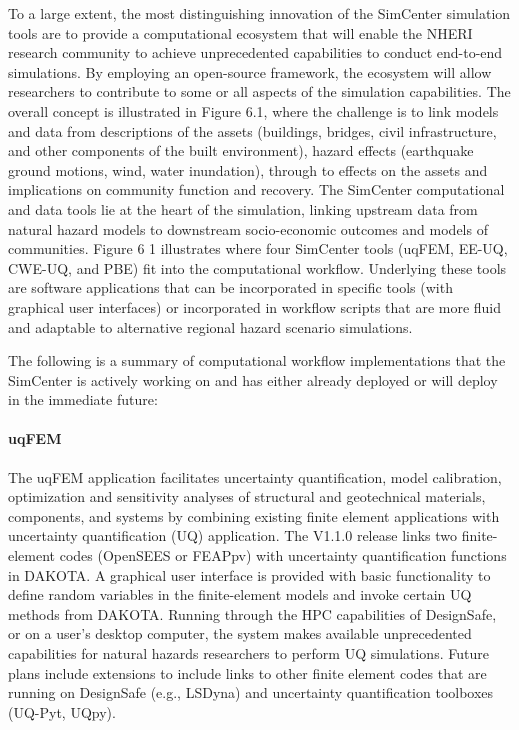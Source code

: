 To a large extent, the most distinguishing innovation of the SimCenter simulation tools are to provide a computational ecosystem that will enable the NHERI research community to achieve unprecedented capabilities to conduct end-to-end simulations. By employing an open-source framework, the ecosystem will allow researchers to contribute to some or all aspects of the simulation capabilities. The overall concept is illustrated in Figure 6.1, where the challenge is to link models and data from descriptions of the assets (buildings, bridges, civil infrastructure, and other components of the built environment), hazard effects (earthquake ground motions, wind, water inundation), through to effects on the assets and implications on community function and recovery. The SimCenter computational and data tools lie at the heart of the simulation, linking upstream data from natural hazard models to downstream socio-economic outcomes and models of communities. Figure 6 1 illustrates where four SimCenter tools (uqFEM, EE-UQ, CWE-UQ, and PBE) fit into the computational workflow. Underlying these tools are software applications that can be incorporated in specific tools (with graphical user interfaces) or incorporated in workflow scripts that are more fluid and adaptable to alternative regional hazard scenario simulations. 

The following is a summary of computational workflow implementations that the SimCenter is actively working on and has either already deployed or will deploy in the immediate future:

\paragraph{uqFEM} The uqFEM application facilitates uncertainty quantification, model calibration, optimization and sensitivity analyses of structural and geotechnical materials, components, and systems by combining existing finite element applications with uncertainty quantification (UQ) application. The V1.1.0 release links two finite-element codes (OpenSEES or FEAPpv) with uncertainty quantification functions in DAKOTA. A graphical user interface is provided with basic functionality to define random variables in the finite-element models and invoke certain UQ methods from DAKOTA. Running through the HPC capabilities of DesignSafe, or on a user's desktop computer, the system makes available unprecedented capabilities for natural hazards researchers to perform UQ simulations. Future plans include extensions to include links to other finite element codes that are running on DesignSafe (e.g., LSDyna) and uncertainty quantification toolboxes (UQ-Pyt, UQpy).

